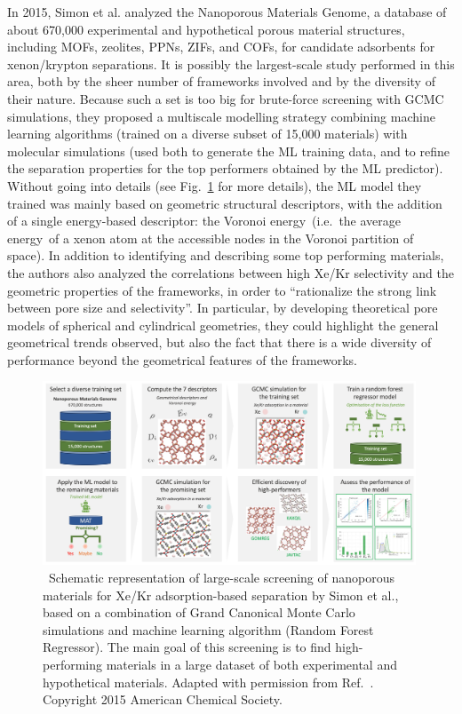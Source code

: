\documentclass[main.tex]{subfiles}
\begin{document}
In 2015, Simon et al.\cite{Simon_2015} analyzed the Nanoporous Materials Genome,\cite{Simon_2015_EES, Boyd_2017} a database of about 670,000 experimental and hypothetical porous material structures, including MOFs, zeolites, PPNs, ZIFs, and COFs, for candidate adsorbents for xenon/krypton separations. It is possibly the largest-scale study performed in this area, both by the sheer number of frameworks involved and by the diversity of their nature. Because such a set is too big for brute-force screening with GCMC simulations, they proposed a multiscale modelling strategy combining machine learning algorithms (trained on a diverse subset of 15,000 materials) with molecular simulations (used both to generate the ML training data, and to refine the separation properties for the top performers obtained by the ML predictor). Without going into details (see Fig.~\ref{fgr:Simon} for more details), the ML model they trained was mainly based on geometric structural descriptors, with the addition of a single energy-based descriptor: the Voronoi energy\ (i.e.\ the average energy\ of a xenon atom at the accessible nodes in the Voronoi partition of space). In addition to identifying and describing some top performing materials, the authors also analyzed the correlations between high Xe/Kr selectivity and the geometric properties of the frameworks, in order to ``rationalize the strong link between pore size and selectivity''. In particular, by developing theoretical pore models of spherical and cylindrical geometries, they could highlight the general geometrical trends observed, but also the fact that there is a wide diversity of performance beyond the geometrical features of the frameworks.

\begin{figure}[t]
    \centering
    \includegraphics[width=0.99\textwidth]{figures/1-screening/Simon.jpg}
    \caption{\ Schematic representation of large-scale screening of nanoporous materials for Xe/Kr adsorption-based separation by Simon et al.,\cite{Simon_2015} based on a combination of Grand Canonical Monte Carlo simulations and machine learning algorithm (Random Forest Regressor). The main goal of this screening is to find high-performing materials in a large dataset of both experimental and hypothetical materials. 
    Adapted with permission from Ref.~. Copyright 2015 American Chemical Society.
    }\label{fgr:Simon}
\end{figure}
\end{document}
